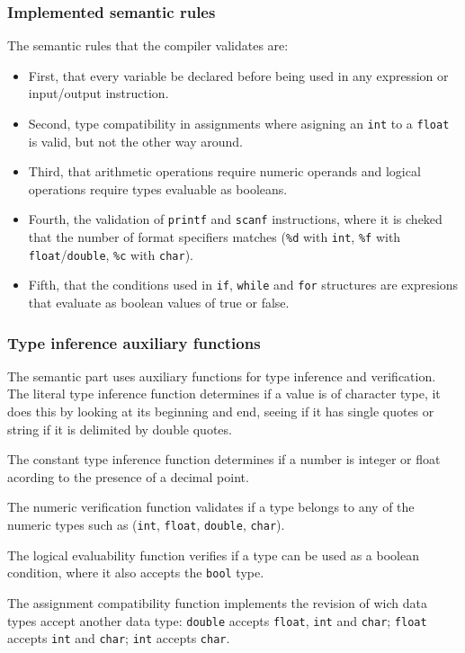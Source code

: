 \documentclass[letterpaper,12pt,oneside]{article}
\begin{document}
\subsubsection{Implemented semantic rules}

The semantic rules that the compiler validates are: 
\begin{itemize}
    \item First, that every variable be declared before being used in any expression or input/output instruction.
    \item Second, type compatibility in assignments where asigning an \texttt{int} to a \texttt{float} is valid, but not the other way around.
    \item Third, that arithmetic operations require numeric operands and logical operations require types evaluable as booleans. 
    \item Fourth, the validation of \texttt{printf} and \texttt{scanf} instructions, where it is cheked that the number of format specifiers matches (\texttt{\%d} with \texttt{int}, \texttt{\%f} with \texttt{float}/\texttt{double}, \texttt{\%c} with \texttt{char}).
    \item Fifth, that the conditions used in \texttt{if}, \texttt{while} and \texttt{for} structures are expresions that evaluate as boolean values of true or false.
\end{itemize}


\subsubsection{Type inference auxiliary functions}

The semantic part uses auxiliary functions for type inference and verification. The literal type inference function determines if a value is of character type, it does this by looking at its beginning and end, seeing if it has single quotes or string if it is delimited by double quotes. 

The constant type inference function determines if a number is integer or float acording to the presence of a decimal point. 

The numeric verification function validates if a type belongs to any of the numeric types such as (\texttt{int}, \texttt{float}, \texttt{double}, \texttt{char}). 

The logical evaluability function verifies if a type can be used as a boolean condition, where it also accepts the \texttt{bool} type. 

The assignment compatibility function implements the revision of wich data types accept another data type: \texttt{double} accepts \texttt{float}, \texttt{int} and \texttt{char}; \texttt{float} accepts \texttt{int} and \texttt{char}; \texttt{int} accepts \texttt{char}. 
\end{document}
